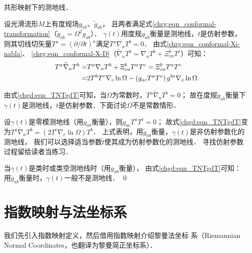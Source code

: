 \begin{example}
	共形映射下的测地线．
\end{example}
设光滑流形$M$上有度规场$g_{ab}$、$\tilde{g}_{ab}$，
且两者满足式\eqref{chrg:eqn_conformal-transformation}（$\tilde{g}_{ab} = \Omega^2 g_{ab}$）．
$\gamma(t)$用度规$g_{ab}$衡量是测地线，$t$是仿射参数，
则其切线切矢量$T^a = (\partial / \partial t)^a$满足$T^a \nabla_a T^b=0$．
由式\eqref{chrg:eqn_conformal-Xi-nabla}、
\eqref{chrg:eqn_conformal-X-D}（$\widetilde{\nabla}_a T^b =\nabla_a T^b+ \Xi_{ca}^b T^c$）可知：
\begin{align}
	T^a \widetilde{\nabla}_a T^b  =& T^a \nabla_a T^b+\Xi_{ca}^b T^a T^c = \Xi_{ca}^b T^a T^c \notag \\
	=&2 T^b T^c \nabla_c \ln \Omega-\left(g_{ac} T^a T^c\right) g^{b e} \nabla_e \ln \Omega.
	\label{chgd:eqn_TNTgdT}
\end{align}

由式\eqref{chgd:eqn_TNTgdT}可知，当$\Omega$为常数时，$T^a \widetilde{\nabla}_a T^b =0$；
故在度规$\tilde{g}_{ab}$衡量下$\gamma(t)$是测地线，$t$是仿射参数．下面讨论$\Omega$不是常数情形．

设$\gamma(t)$是零模测地线（用${g}_{ab}$衡量），则$g_{ac} T^a T^c=0$；
故式\eqref{chgd:eqn_TNTgdT}变为$T^a \widetilde{\nabla}_a T^b=(2 T^c \nabla_c \ln \Omega) T^b$．
上式表明，用$\tilde{g}_{ab}$衡量，$\gamma(t)$是非仿射参数化的测地线，
我们可以选择适当参数$\tilde{t}$使其成为仿射参数化的测地线．
寻找仿射参数过程留给读者当练习．

当$\gamma(t)$是类时或类空测地线时（用${g}_{ab}$衡量），
由式\eqref{chgd:eqn_TNTgdT}可知：
用$\tilde{g}_{ab}$衡量时，$\gamma(t)$一般不是测地线．
\qed


 

\section{指数映射与法坐标系}\label{chgd:sec_exp-RNC}
我们先引入指数映射定义，然后借用指数映射介绍黎曼法坐标
系（Riemannian Normal Coordinates，也翻译为{\kaishu 黎曼简正坐标系}）．


